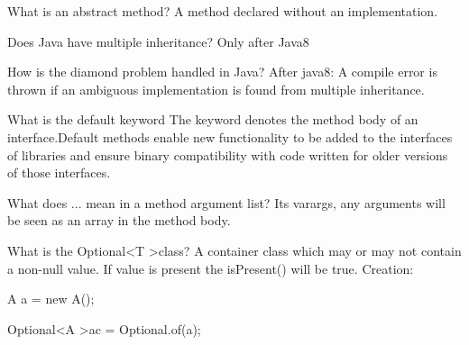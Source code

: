 \documentclass[avery5371,grid]{flashcards}
\begin{document}
\begin{flashcard}[Lang]{What is an abstract method?}
A method declared without an implementation.
\end{flashcard}

\begin{flashcard}[Lang]{Does Java have multiple inheritance?}
Only after Java8
\end{flashcard}

\begin{flashcard}[Lang]{How is the diamond problem handled in Java?}
After java8: A compile error is thrown if an ambiguous implementation is found from multiple inheritance.
\end{flashcard}

\begin{flashcard}[Lang]{What is the default keyword}
The keyword denotes the method body of an interface.Default methods enable new functionality to be added to the interfaces of libraries and ensure binary compatibility with code written for older versions of those interfaces.
\end{flashcard}

\begin{flashcard}[Lang]{What does ... mean in a method argument list?}
Its varargs, any arguments will be seen as an array in the method body.
\end{flashcard}

\begin{flashcard}[Lang]{What is the Optional\textless T \textgreater class?}
A container class which may or may not contain a non-null value. If value is present the isPresent() will be true. Creation:

A a = new A();

Optional\textless A \textgreater ac = Optional.of(a);
\end{flashcard}
\end{document}
